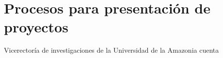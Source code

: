 \chapter{Procesos para presentaci\'on de proyectos}

Vicerectoría de investigaciones de la Universidad de la
Amazonia cuenta 